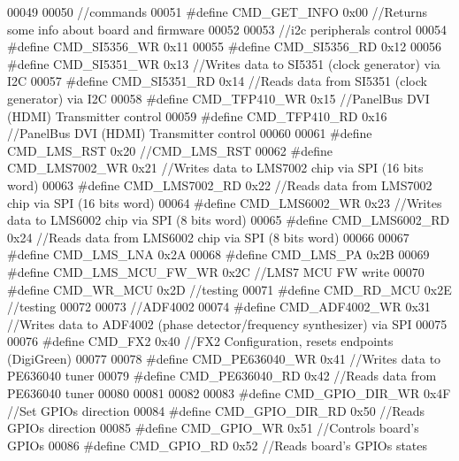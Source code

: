 \begin{DoxyCode}
00049 
00050 \textcolor{comment}{//commands}
00051 \textcolor{preprocessor}{#define CMD\_GET\_INFO        0x00 //Returns some info about board and firmware}
00052 
00053 \textcolor{comment}{//i2c peripherals control}
00054 \textcolor{preprocessor}{#define CMD\_SI5356\_WR       0x11}
00055 \textcolor{preprocessor}{#define CMD\_SI5356\_RD       0x12}
00056 \textcolor{preprocessor}{#define CMD\_SI5351\_WR       0x13 //Writes data to SI5351 (clock generator) via I2C}
00057 \textcolor{preprocessor}{#define CMD\_SI5351\_RD       0x14 //Reads data from SI5351 (clock generator) via I2C}
00058 \textcolor{preprocessor}{#define CMD\_TFP410\_WR       0x15 //PanelBus DVI (HDMI) Transmitter control}
00059 \textcolor{preprocessor}{#define CMD\_TFP410\_RD       0x16 //PanelBus DVI (HDMI) Transmitter control}
00060 
00061 \textcolor{preprocessor}{#define CMD\_LMS\_RST         0x20 //CMD\_LMS\_RST}
00062 \textcolor{preprocessor}{#define CMD\_LMS7002\_WR      0x21 //Writes data to LMS7002 chip via SPI (16 bits word)}
00063 \textcolor{preprocessor}{#define CMD\_LMS7002\_RD      0x22 //Reads data from LMS7002 chip via SPI (16 bits word)}
00064 \textcolor{preprocessor}{#define CMD\_LMS6002\_WR      0x23 //Writes data to LMS6002 chip via SPI (8 bits word)}
00065 \textcolor{preprocessor}{#define CMD\_LMS6002\_RD      0x24 //Reads data from LMS6002 chip via SPI (8 bits word)}
00066 
00067 \textcolor{preprocessor}{#define CMD\_LMS\_LNA         0x2A}
00068 \textcolor{preprocessor}{#define CMD\_LMS\_PA          0x2B}
00069 \textcolor{preprocessor}{#define CMD\_LMS\_MCU\_FW\_WR   0x2C //LMS7 MCU FW write}
00070 \textcolor{preprocessor}{#define CMD\_WR\_MCU          0x2D //testing}
00071 \textcolor{preprocessor}{#define CMD\_RD\_MCU          0x2E //testing}
00072 
00073 \textcolor{comment}{//ADF4002}
00074 \textcolor{preprocessor}{#define CMD\_ADF4002\_WR      0x31 //Writes data to ADF4002 (phase detector/frequency synthesizer) via SPI}
00075 
00076 \textcolor{preprocessor}{#define CMD\_FX2             0x40 //FX2 Configuration, resets endpoints (DigiGreen)}
00077 
00078 \textcolor{preprocessor}{#define CMD\_PE636040\_WR     0x41 //Writes data to PE636040 tuner}
00079 \textcolor{preprocessor}{#define CMD\_PE636040\_RD     0x42 //Reads data from PE636040 tuner}
00080 
00081 
00082 
00083 \textcolor{preprocessor}{#define CMD\_GPIO\_DIR\_WR     0x4F //Set GPIOs direction}
00084 \textcolor{preprocessor}{#define CMD\_GPIO\_DIR\_RD     0x50 //Reads GPIOs direction}
00085 \textcolor{preprocessor}{#define CMD\_GPIO\_WR         0x51 //Controls board's GPIOs}
00086 \textcolor{preprocessor}{#define CMD\_GPIO\_RD         0x52 //Reads board's GPIOs states}

\end{DoxyCode}
